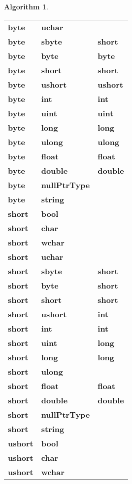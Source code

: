 \documentclass[a4paper,oneside,11pt]{book}
\theoremstyle{definition}
\newtheorem{algo}{Algorithm}[section]
\begin{document}
\begin{algo}
\begin{flushleft}
\begin{supertabular}{lll}
\textbf{byte}& \textbf{uchar}& \\
\textbf{byte}& \textbf{sbyte}& \textbf{short}\\
\textbf{byte}& \textbf{byte}& \textbf{byte}\\
\textbf{byte}& \textbf{short}& \textbf{short}\\
\textbf{byte}& \textbf{ushort}& \textbf{ushort}\\
\textbf{byte}& \textbf{int}& \textbf{int}\\
\textbf{byte}& \textbf{uint}& \textbf{uint}\\
\textbf{byte}& \textbf{long}& \textbf{long}\\
\textbf{byte}& \textbf{ulong}& \textbf{ulong}\\
\textbf{byte}& \textbf{float}& \textbf{float}\\
\textbf{byte}& \textbf{double}& \textbf{double}\\
\textbf{byte}& \textbf{nullPtrType}& \\
\textbf{byte}& \textbf{string}& \\
\hline
\textbf{short}& \textbf{bool}& \\
\textbf{short}& \textbf{char}& \\
\textbf{short}& \textbf{wchar}& \\
\textbf{short}& \textbf{uchar}& \\
\textbf{short}& \textbf{sbyte}& \textbf{short}\\
\textbf{short}& \textbf{byte}& \textbf{short}\\
\textbf{short}& \textbf{short}& \textbf{short}\\
\textbf{short}& \textbf{ushort}& \textbf{int}\\
\textbf{short}& \textbf{int}& \textbf{int}\\
\textbf{short}& \textbf{uint}& \textbf{long}\\
\textbf{short}& \textbf{long}& \textbf{long}\\
\textbf{short}& \textbf{ulong}& \\
\textbf{short}& \textbf{float}& \textbf{float}\\
\textbf{short}& \textbf{double}& \textbf{double}\\
\textbf{short}& \textbf{nullPtrType}& \\
\textbf{short}& \textbf{string}& \\
\hline
\textbf{ushort}& \textbf{bool}& \\
\textbf{ushort}& \textbf{char}& \\
\textbf{ushort}& \textbf{wchar}& \\

\end{supertabular}
\end{flushleft}
\end{algo}
\end{document}
